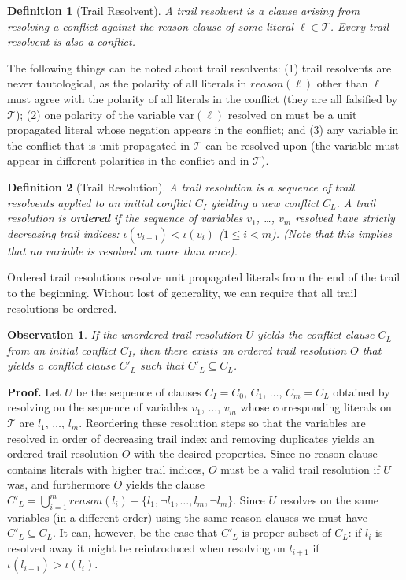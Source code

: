 \documentclass[runningheads]{llncs}
\newcommand{\trail}{\ensuremath{\mathcal{T}}}
\newcommand{\trailIdx}[1]{\ensuremath{\iota(#1)}}
\newcommand{\var}{\text{var}}
\newcommand{\reason}[1]{\ensuremath{\mathit{reason}(#1)}}
\newtheorem{Obs}{Observation}
\newtheorem{defn}{Definition}
\newcommand{\whitebox}{\raisebox{.5ex}{\fbox{\hspace*{.2ex}}}}
\begin{document}
\begin{defn}[Trail Resolvent]
    A trail resolvent is a clause arising from resolving a conflict
    against the reason clause of some literal $\ell \in \trail$. Every
    trail resolvent is also a conflict.
\end{defn}

The following things can be noted about trail resolvents: (1) trail
resolvents are never tautological, as the polarity of all literals in
$\reason{\ell}$ other than $\ell$ must agree with the polarity of all
literals in the conflict (they are all falsified by $\trail$); (2) one
polarity of the variable $\var(\ell)$ resolved on must be a unit
propagated literal whose negation appears in the conflict; and (3) any
variable in the conflict that is unit propagated in $\trail$ can be
resolved upon (the variable must appear in different polarities in the
conflict and in $\trail$).

\begin{defn}[Trail Resolution]
    A trail resolution is a sequence of trail resolvents applied to an
    initial conflict $C_I$ yielding a new conflict $C_L$.  A trail
    resolution is \textbf{ordered} if the sequence of variables $v_1$,
    \dots, $v_m$ resolved have strictly decreasing trail indices:
    $\trailIdx{v_{i+1}} < \trailIdx{v_i}$ ($1\leq i < m$). (Note that
    this implies that no variable is resolved on more than once).
\end{defn}

Ordered trail resolutions resolve unit propagated literals from the
end of the trail to the beginning. Without lost of generality, we can
require that all trail resolutions be ordered.

\begin{Obs}
    \label{obs:ordered}
    If the unordered trail resolution $U$ yields the conflict clause
    $C_L$ from an initial conflict $C_I$, then there exists an ordered
    trail resolution $O$ that yields a conflict clause $C'_L$ such
    that $C'_L\subseteq C_L$.
\end{Obs}
\noindent
\textbf{Proof.} Let $U$ be the sequence of clauses $C_I = C_0$, $C_1$,
$\ldots$, $C_m= C_L$ obtained by resolving on the sequence of
variables $v_1$, $\ldots$, $v_m$ whose corresponding literals on
$\trail$ are $l_1$, $\ldots$, $l_m$. Reordering these resolution steps
so that the variables are resolved in order of decreasing trail index
and removing duplicates yields an ordered trail resolution $O$ with
the desired properties. Since no reason clause contains literals with
higher trail indices, $O$ must be a valid trail resolution if $U$
was, and furthermore $O$ yields the clause
$C'_L = \bigcup_{i=1}^m \reason{l_i} - \{l_1, \lnot l_1, \ldots, l_m,
\lnot l_m\}$. Since $U$ resolves on the same variables (in a different
order) using the same reason clauses we must have $C'_L\subseteq
C_L$. It can, however, be the case that $C'_L$ is proper subset of
$C_L$: if $l_i$ is resolved away it might be reintroduced when
resolving on $l_{i+1}$ if $\trailIdx{l_{i+1}}  > \trailIdx{l_i}$.
\whitebox
\end{document}
